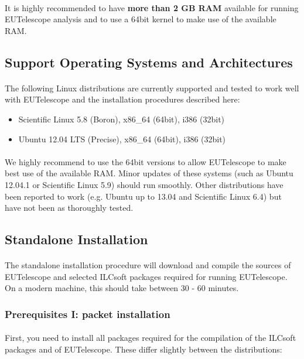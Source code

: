 \documentclass[11pt]{article}
\begin{document}
\paragraph{}
It is highly recommended to have \textbf{more than 2 GB RAM} available for running EUTelescope analysis and to use a 64bit kernel to make use of the available RAM.
\subsection{Support Operating Systems and Architectures}
\paragraph{}
The following Linux distributions are currently supported and tested to work well with EUTelescope and the installation procedures described here:\\
\begin{itemize}
	\item Scientific Linux 5.8 (Boron), x86\_64 (64bit), i386 (32bit)
	\item Ubuntu 12.04 LTS (Precise), x86\_64 (64bit), i386 (32bit)
\end{itemize}
\paragraph{}
We highly recommend to use the 64bit versions to allow EUTelescope to make best use of the available RAM. Minor updates of these systems (such as Ubuntu 12.04.1 or Scientific Linux 5.9) should run smoothly. Other distributions have been reported to work (e.g. Ubuntu up to 13.04 and Scientific Linux 6.4) but have not been as thoroughly tested.
\subsection{Standalone Installation}
\paragraph{}
The standalone installation procedure will download and compile the sources of EUTelescope and selected ILCsoft packages required for running EUTelescope. On a modern machine, this should take between 30 - 60 minutes.
\subsubsection{Prerequisites I: packet installation}
\paragraph{}
First, you need to install all packages required for the compilation of the ILCsoft packages and of EUTelescope. These differ slightly between the distributions:\\
\end{document}
